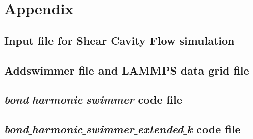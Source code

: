 \chapter{Appendix}
\label{sec:appendix}

\section{Input file for Shear Cavity Flow simulation}
\label{app:NURBSVolumenelement}




\section{Addswimmer file and LAMMPS data grid file}
\label{app:addswimmer}




\section{\textit{bond$\_$harmonic$\_$swimmer} code file}
\label{app:bond harmonic swimmer}



\section{\textit{bond$\_$harmonic$\_$swimmer$\_$extended$\_$k} code file}
\label{app:bond harmonic swimmer ext k}

